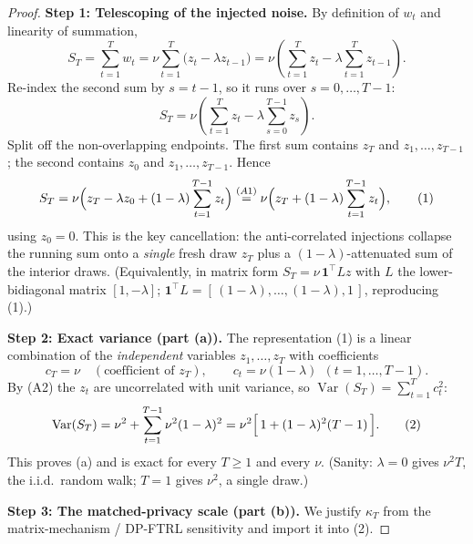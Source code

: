 \begin{proof}
\par\smallskip\noindent\textbf{Step 1: Telescoping of the injected noise.}\quad 
By definition of $w_t$ and linearity of summation,
\[
S_T=\sum_{t=1}^{T} w_t
=\nu\sum_{t=1}^{T}\bigl(z_t-\lambda z_{t-1}\bigr)
=\nu\left(\sum_{t=1}^{T} z_t-\lambda\sum_{t=1}^{T} z_{t-1}\right).
\]
Re-index the second sum by $s=t-1$, so it runs over $s=0,\dots,T-1$:
\[
S_T=\nu\left(\sum_{t=1}^{T} z_t-\lambda\sum_{s=0}^{T-1} z_s\right).
\]
Split off the non-overlapping endpoints. The first sum contains $z_T$ and $z_1,\dots,z_{T-1}$; the second contains $z_0$ and $z_1,\dots,z_{T-1}$. Hence
\[
S_T=\nu\Bigl(z_T-\lambda z_0+(1-\lambda)\sum_{t=1}^{T-1} z_t\Bigr)
\overset{(A1)}{=}\nu\Bigl(z_T+(1-\lambda)\sum_{t=1}^{T-1} z_t\Bigr),
\tag{1}
\]
using $z_0=0$. This is the key cancellation: the anti-correlated injections collapse the running sum onto a \emph{single} fresh draw $z_T$ plus a $(1-\lambda)$-attenuated sum of the interior draws. (Equivalently, in matrix form $S_T=\nu\,\mathbf 1^\top L z$ with $L$ the lower-bidiagonal matrix $[1,-\lambda]$; $\mathbf 1^\top L=[\,(1-\lambda),\dots,(1-\lambda),1\,]$, reproducing (1).)

\par\smallskip\noindent\textbf{Step 2: Exact variance (part (a)).}\quad 
The representation (1) is a linear combination of the \emph{independent} variables $z_1,\dots,z_T$ with coefficients
\[
c_T=\nu \quad(\text{coefficient of }z_T),\qquad c_t=\nu(1-\lambda)\ \ (t=1,\dots,T-1).
\]
By (A2) the $z_t$ are uncorrelated with unit variance, so $\operatorname{Var}(S_T)=\sum_{t=1}^{T}c_t^2$:
\[
\operatorname{Var}(S_T)
=\nu^2+\sum_{t=1}^{T-1}\nu^2(1-\lambda)^2
=\nu^2\Bigl[\,1+(1-\lambda)^2(T-1)\,\Bigr].
\tag{2}
\]
This proves (a) and is exact for every $T\ge1$ and every $\nu$. (Sanity: $\lambda=0$ gives $\nu^2 T$, the i.i.d.\ random walk; $T=1$ gives $\nu^2$, a single draw.)

\par\smallskip\noindent\textbf{Step 3: The matched-privacy scale (part (b)).}\quad 
We justify $\kappa_T$ from the matrix-mechanism / DP-FTRL sensitivity and import it into (2).


\end{proof}
